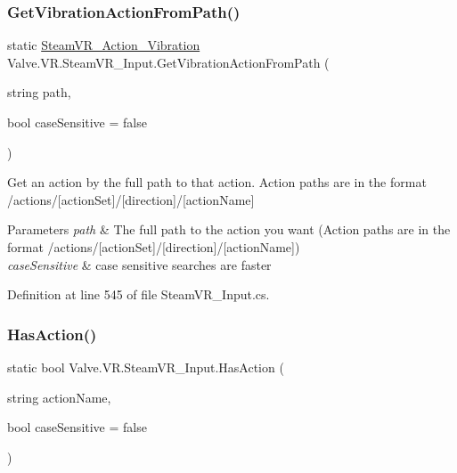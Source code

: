 \subsubsection{\texorpdfstring{GetVibrationActionFromPath()}{GetVibrationActionFromPath()}}
{\footnotesize\ttfamily static \mbox{\hyperlink{class_valve_1_1_v_r_1_1_steam_v_r___action___vibration}{Steam\+V\+R\+\_\+\+Action\+\_\+\+Vibration}} Valve.\+V\+R.\+Steam\+V\+R\+\_\+\+Input.\+Get\+Vibration\+Action\+From\+Path (\begin{DoxyParamCaption}\item[{string}]{path,  }\item[{bool}]{case\+Sensitive = {\ttfamily false} }\end{DoxyParamCaption})\hspace{0.3cm}{\ttfamily [static]}}



Get an action by the full path to that action. Action paths are in the format /actions/\mbox{[}action\+Set\mbox{]}/\mbox{[}direction\mbox{]}/\mbox{[}action\+Name\mbox{]} 


\begin{DoxyParams}{Parameters}
{\em path} & The full path to the action you want (Action paths are in the format /actions/\mbox{[}action\+Set\mbox{]}/\mbox{[}direction\mbox{]}/\mbox{[}action\+Name\mbox{]})\\
\hline
{\em case\+Sensitive} & case sensitive searches are faster\\
\hline
\end{DoxyParams}


Definition at line 545 of file Steam\+V\+R\+\_\+\+Input.\+cs.

\mbox{\label{class_valve_1_1_v_r_1_1_steam_v_r___input_a06b62e993650c4186256d2206702ffa7}} 
\subsubsection{\texorpdfstring{HasAction()}{HasAction()}\hspace{0.1cm}{\footnotesize\ttfamily [1/2]}}
{\footnotesize\ttfamily static bool Valve.\+V\+R.\+Steam\+V\+R\+\_\+\+Input.\+Has\+Action (\begin{DoxyParamCaption}\item[{string}]{action\+Name,  }\item[{bool}]{case\+Sensitive = {\ttfamily false} }\end{DoxyParamCaption})\hspace{0.3cm}{\ttfamily [static]}}



